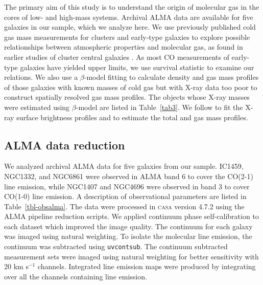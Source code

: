 \documentclass[iop]{emulateapj}
\begin{document}
The primary aim of this study is to understand the origin of molecular gas in the cores of low- and high-mass systems.  Archival ALMA data are available for five galaxies in our sample, which we analyze here. We use previously published cold gas mass measurements for clusters and early-type galaxies to explore possible relationships between atmospheric properties and molecular gas, as found in earlier studies of cluster central galaxies  \citep{Cavagnolo:08, Rafferty:08, Voit:15a, Pulido:17}. As most CO measurements of early-type galaxies have yielded upper limits, we use survival statistic to examine our relations. We also use a $\beta$-model \citep{Cavaliere:78, Babyk:12lviv, BabykDel:14} fitting to calculate density and gas mass profiles of those galaxies with known masses of cold gas but with X-ray data too poor to construct spatially resolved gas mass profiles. The objects  whose X-ray masses were estimated using $\beta$-model are listed in Table~\ref{tab3}. We follow \citet{Babyk:17scal} to fit the X-ray surface brightness profiles and to estimate the total and gas mass profiles.

\subsection{ALMA data reduction}
We analyzed archival ALMA data for five galaxies from our sample. IC1459, NGC1332, and NGC6861 were observed in ALMA band 6 to cover the CO(2-1) line emission, while NGC1407 and NGC4696 were observed in band 3 to cover CO(1-0) line emission. A description of observational parameters are listed in Table~\ref{tbl-obsalma}. The data were processed in \textsc{casa} version 4.7.2 using the ALMA pipeline reduction scripts. We applied continuum phase self-calibration to each dataset which improved the image quality. The continuum for each galaxy was imaged using natural weighting. To isolate the molecular line emission, the continuum was subtracted using \texttt{uvcontsub}. The continuum subtracted measurement sets were imaged using natural weighting for better sensitivity with 20 km s$^{-1}$ channels. Integrated line emission maps were produced by integrating over all the channels containing line emission.
\end{document}
